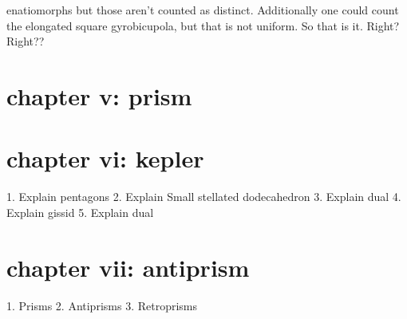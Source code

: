 \documentclass{article}
\begin{document}
enatiomorphs but those aren't counted as distinct. Additionally one could count the elongated square gyrobicupola, but that is not uniform. So that is it. Right? Right??
\section*{chapter v: prism}

\section*{chapter vi: kepler}
1. Explain pentagons
2. Explain Small stellated dodecahedron
3. Explain dual
4. Explain gissid
5. Explain dual
 \section*{chapter vii: antiprism}
1. Prisms
2. Antiprisms
3. Retroprisms
\end{document}
